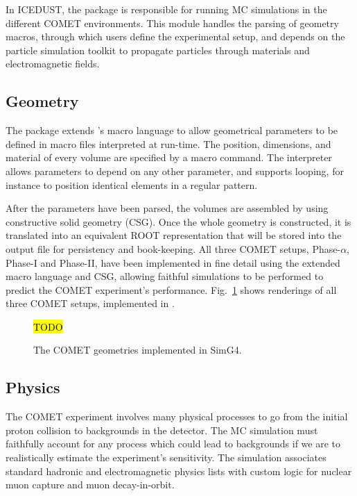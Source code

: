In ICEDUST, the \SimG package is responsible for running MC simulations in the different COMET environments. This module handles the parsing of geometry macros, through which users define the experimental setup, and depends on the \Geant~\cite{AGOSTINELLI2003250} particle simulation toolkit to propagate particles through materials and electromagnetic fields.

\subsection{Geometry}
The \SimG package extends \Geant's macro language to allow geometrical parameters to be defined in macro files interpreted at run-time. The position, dimensions, and material of every volume are specified by a macro command. The interpreter allows parameters to depend on any other parameter, and supports looping, for instance to position identical elements in a regular pattern. 

After the parameters have been parsed, the volumes are assembled by \Geant using constructive solid geometry (CSG). Once the whole geometry is constructed, it is translated into an equivalent ROOT representation that will be stored into the output \oaEvent file for persistency and book-keeping.
All three COMET setups, Phase-$\alpha$, Phase-I and Phase-II, have been implemented in fine detail using the extended macro language and CSG, allowing faithful simulations to be performed to predict the COMET experiment's performance.
Fig.~\ref{fig:comet geometries} shows renderings of all three COMET setups, implemented in \SimG. 

\begin{figure}
    \centering
    \hl{TODO}
    \caption{The COMET geometries implemented in SimG4.}
    \label{fig:comet geometries}
\end{figure}


\subsection{Physics}
The COMET experiment involves many physical processes to go from the initial proton collision to backgrounds in the detector.
The MC simulation must faithfully account for any process which could lead to backgrounds if we are to realistically estimate the experiment's sensitivity. The \SimG simulation associates standard \Geant hadronic and electromagnetic physics lists with custom logic for nuclear muon capture and muon decay-in-orbit.

